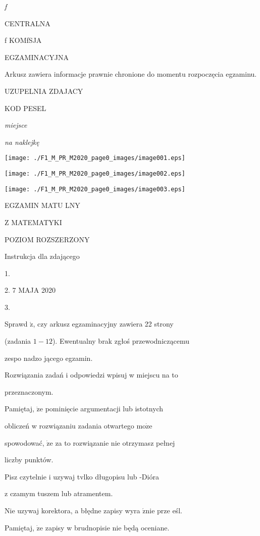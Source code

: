\documentclass[a4paper,12pt]{article}
\begin{document}
{\it f}

CENTRALNA

f KOMfSJA

EGZAMINACYJNA

Arkusz zawiera informacje prawnie chronione do momentu rozpoczęcia egzaminu.

UZUPELNIA ZDAJACY

KOD PESEL

{\it miejsce}

{\it na naklejkę}
\begin{center}
\texttt{[image: ./F1\_M\_PR\_M2020\_page0\_images/image001.eps]}

\texttt{[image: ./F1\_M\_PR\_M2020\_page0\_images/image002.eps]}

\texttt{[image: ./F1\_M\_PR\_M2020\_page0\_images/image003.eps]}
\end{center}
EGZAMIN MATU LNY

Z MATEMATYKI

POZIOM ROZSZERZONY

Instrukcja dla zdającego

1.

2.  7 MAJA 2020

3.

Sprawd $\acute{\mathrm{z}}$, czy arkusz egzaminacyjny zawiera 22 strony

(zadania $1-12$). Ewentualny brak zgłoś przewodniczącemu

zespo nadzo jącego egzamin.

Rozwiązania zadań i odpowiedzi wpisuj w miejscu na to

przeznaczonym.

Pamiętaj, $\dot{\mathrm{z}}\mathrm{e}$ pominięcie argumentacji lub istotnych

obliczeń w rozwiązaniu zadania otwartego $\mathrm{m}\mathrm{o}\dot{\mathrm{z}}\mathrm{e}$

spowodować, $\dot{\mathrm{z}}\mathrm{e}$ za to rozwiązanie nie otrzymasz pełnej

liczby punktów.

Pisz czytelnie i uzywaj tvlko długopisu lub -Dióra

z czamym tuszem lub atramentem.

Nie uzywaj korektora, a błędne zapisy wyra $\acute{\mathrm{z}}\mathrm{n}\mathrm{i}\mathrm{e}$ prze eśl.

Pamiętaj, $\dot{\mathrm{z}}\mathrm{e}$ zapisy w brudnopisie nie będą oceniane.
\end{document}
